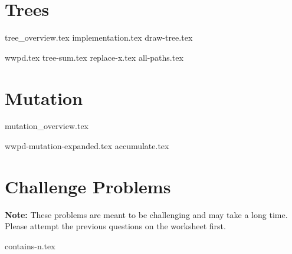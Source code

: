 \documentclass{exam}
\begin{document}
\section{Trees}
{tree_overview.tex}
{implementation.tex}
{draw-tree.tex}
\vspace{.5cm}
\begin{questions}
{wwpd.tex}
\newpage
{tree-sum.tex}
\newpage
{replace-x.tex}
\newpage
{all-paths.tex}
\end{questions}

\newpage
\section{Mutation}
{mutation_overview.tex}
\begin{questions}
{wwpd-mutation-expanded.tex}
{accumulate.tex}
\end{questions}


\newpage
\section{Challenge Problems}
\textbf{Note:} These problems are meant to be challenging and may take a long time. Please attempt the previous questions on the worksheet first.
\begin{questions}
{contains-n.tex}
\end{questions}
\end{document}
